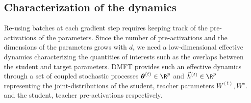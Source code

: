 \subsection{Characterization of the dynamics}


\label{2402:sec:main:asymptotics}
Re-using batches at each gradient step requires keeping track of the pre-activations of the parameters. Since  the number of pre-activations and the dimensions of the parameters grows with $d$, we need a low-dimensional effective dynamics characterizing the quantities of interests such as the overlaps between the student and target parameters. DMFT provides such an effective dynamics through a set of coupled stochastic processes $\boldsymbol \theta^{(t)} \in \R^p$ and $\vec h^{(t)} \in \R^p$ representing the joint-distributions of the student, teacher parameters  $W^{(t)}, W^\star$. and the student, teacher pre-activations respectively.

